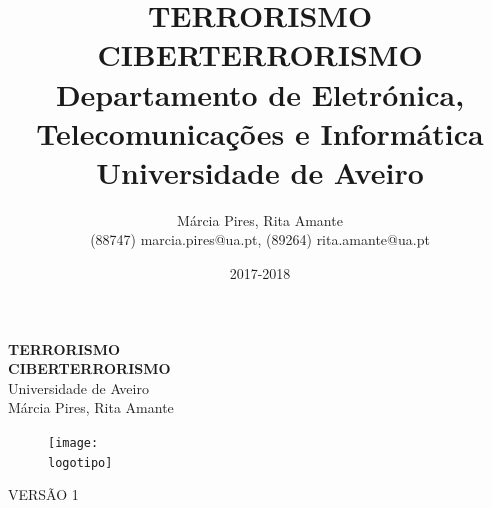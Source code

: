 \documentclass{report}
\begin{document}

\def\titulo{TERRORISMO}
\def\subtitulo {CIBERTERRORISMO}
\def\data{2017-2018}
\def\autores{Márcia Pires, Rita Amante}
\def\autorescontactos{(88747) marcia.pires@ua.pt, (89264) rita.amante@ua.pt}
\def\versao{VERSÃO 1}
\def\departamento{Departamento de Eletrónica, Telecomunicações e Informática}
\def\empresa{Universidade de Aveiro }
\def\logotipo{ua.pdf}



\begin{titlepage}

\begin{center}

\vspace*{50mm}
{\Huge \textbf{\titulo}}\\ 
\vspace{10mm}
{\Large\textbf{\subtitulo}}\\
\vspace{10mm}
{\Large \empresa}\\
\vspace{10mm}
{\LARGE \autores}\\ 
\vspace{30mm}

\begin{figure}[h]
\center
\texttt{[image: \\logotipo]}
\end{figure}
\vspace{20mm}
\end{center}

\begin{flushright}
\versao
\end{flushright}
\end{titlepage}

\title{
{\Huge\textbf{\titulo}}\\
\vspace{2.5mm}
{\Large\textbf{\subtitulo}}\\
\vspace{10mm}
{\large \departamento\\ \empresa}
}
\vspace{05mm}
\author{
\vspace{2.5mm}
    \autores \\
    \autorescontactos
}
\vspace{05mm}
\date{\data}
\maketitle
{}
\end{document}
